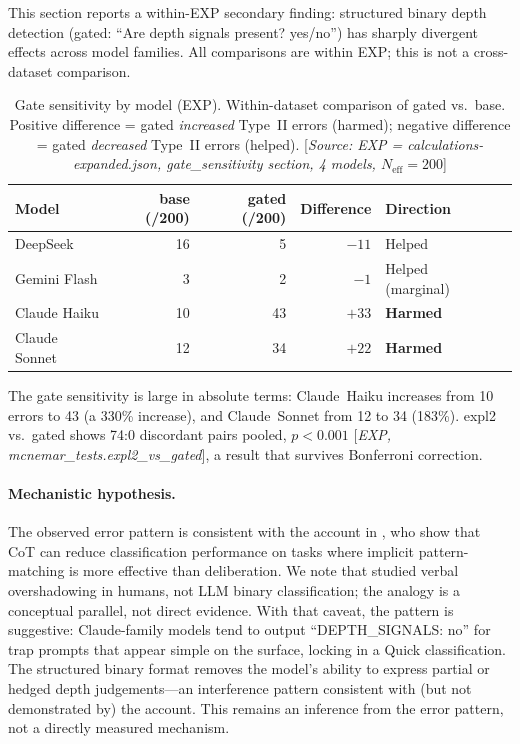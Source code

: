 \documentclass[11pt,a4paper]{article}
\begin{document}
This section reports a within-EXP secondary finding: structured binary
depth detection (\textsf{gated}: ``Are depth signals present? yes/no'')
has sharply divergent effects across model families.  All comparisons are
within EXP; this is not a cross-dataset comparison.

\begin{table}[htbp]
\centering
\caption{Gate sensitivity by model (EXP).  Within-dataset comparison of
  \textsf{gated} vs.\ \textsf{base}.  Positive difference = gated
  \emph{increased} Type~II errors (harmed); negative difference = gated
  \emph{decreased} Type~II errors (helped).
  [\emph{Source: EXP = calculations-expanded.json,
  gate\_sensitivity section, 4 models, $N_\text{eff} = 200$}]}
\label{tab:gate}
\smallskip
\begin{tabular}{@{}lrrrll@{}}
\toprule
Model & \textsf{base} (/200) & \textsf{gated} (/200)
  & Difference & Direction & \\
\midrule
DeepSeek      & 16 &  5 & $-11$ & Helped           & \\
Gemini Flash  &  3 &  2 &  $-1$ & Helped (marginal) & \\
Claude Haiku  & 10 & 43 & $+33$ & \textbf{Harmed}  & \\
Claude Sonnet & 12 & 34 & $+22$ & \textbf{Harmed}  & \\
\bottomrule
\end{tabular}
\end{table}

\noindent The gate sensitivity is large in absolute terms: Claude~Haiku
increases from 10 errors to 43 (a 330\% increase), and Claude~Sonnet from
12 to 34 (183\%).  \textsf{expl2} vs.\ \textsf{gated} shows 74:0 discordant
pairs pooled, $p < 0.001$ [\emph{EXP, mcnemar\_tests.expl2\_vs\_gated}],
a result that survives Bonferroni correction.

\paragraph{Mechanistic hypothesis.}
The observed error pattern is consistent with the account in \citet{Liu2024ICML},
who show that CoT can reduce classification performance on tasks where implicit
pattern-matching is more effective than deliberation.  We note that
\citet{Liu2024ICML} studied verbal overshadowing in humans, not LLM binary
classification; the analogy is a conceptual parallel, not direct evidence.
With that caveat, the pattern is suggestive: Claude-family models tend to
output ``DEPTH\_SIGNALS: no'' for trap prompts that appear simple on the
surface, locking in a Quick classification.  The structured binary format
removes the model's ability to express partial or hedged depth
judgements---an interference pattern consistent with (but not demonstrated by)
the \citet{Liu2024ICML} account.  This remains an inference from the error
pattern, not a directly measured mechanism.
\end{document}
